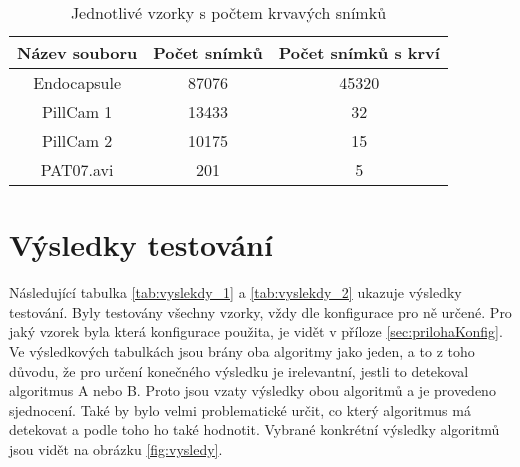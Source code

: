 \begin{table}[h]
	\centering
	\begin{tabular}{|c|c|c|}
		\hline
		\bf Název souboru &  \bf Počet snímků & \bf Počet snímků s krví \\ \hline
		Endocapsule & 87076 & 45320 \\ \hline
		PillCam 1 & 13433 & 32 \\ \hline
		PillCam 2 & 10175 & 15 \\ \hline
		PAT07.avi & 201 & 5 \\ \hline
	\end{tabular}
	\caption{Jednotlivé vzorky s počtem krvavých snímků}
	\label{tab:vzorky}
\end{table}
\section{Výsledky testování}
Následující tabulka \ref{tab:vyslekdy_1} a \ref{tab:vyslekdy_2} ukazuje výsledky testování. Byly testovány všechny vzorky, vždy dle konfigurace pro ně určené. Pro jaký vzorek byla která konfigurace použita, je vidět v příloze \ref{sec:prilohaKonfig}. Ve výsledkových tabulkách jsou brány oba algoritmy jako jeden, a to z toho důvodu, že pro určení konečného výsledku je irelevantní, jestli to detekoval algoritmus A nebo B. Proto jsou vzaty výsledky obou algoritmů a je provedeno sjednocení. Také by bylo velmi problematické určit, co který algoritmus má detekovat a podle toho ho také hodnotit. Vybrané konkrétní výsledky algoritmů jsou vidět na obrázku \ref{fig:vysledy}. 
